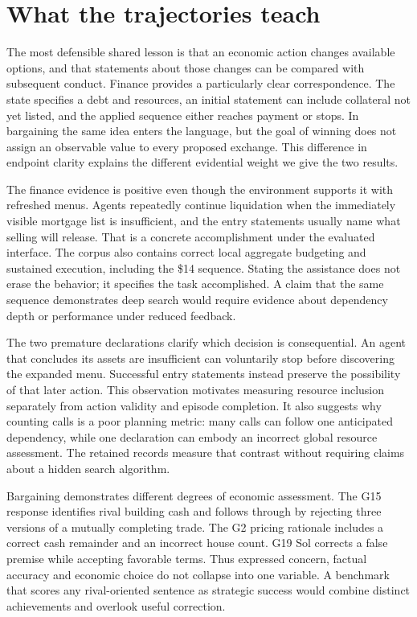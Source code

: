 \section{What the trajectories teach}
The most defensible shared lesson is that an economic action changes available options, and that statements about those changes can be compared with subsequent conduct. Finance provides a particularly clear correspondence. The state specifies a debt and resources, an initial statement can include collateral not yet listed, and the applied sequence either reaches payment or stops. In bargaining the same idea enters the language, but the goal of winning does not assign an observable value to every proposed exchange. This difference in endpoint clarity explains the different evidential weight we give the two results.

The finance evidence is positive even though the environment supports it with refreshed menus. Agents repeatedly continue liquidation when the immediately visible mortgage list is insufficient, and the entry statements usually name what selling will release. That is a concrete accomplishment under the evaluated interface. The corpus also contains correct local aggregate budgeting and sustained execution, including the \$14 sequence. Stating the assistance does not erase the behavior; it specifies the task accomplished. A claim that the same sequence demonstrates deep search would require evidence about dependency depth or performance under reduced feedback.

The two premature declarations clarify which decision is consequential. An agent that concludes its assets are insufficient can voluntarily stop before discovering the expanded menu. Successful entry statements instead preserve the possibility of that later action. This observation motivates measuring resource inclusion separately from action validity and episode completion. It also suggests why counting calls is a poor planning metric: many calls can follow one anticipated dependency, while one declaration can embody an incorrect global resource assessment. The retained records measure that contrast without requiring claims about a hidden search algorithm.

Bargaining demonstrates different degrees of economic assessment. The G15 response identifies rival building cash and follows through by rejecting three versions of a mutually completing trade. The G2 pricing rationale includes a correct cash remainder and an incorrect house count. G19 Sol corrects a false premise while accepting favorable terms. Thus expressed concern, factual accuracy and economic choice do not collapse into one variable. A benchmark that scores any rival-oriented sentence as strategic success would combine distinct achievements and overlook useful correction.

